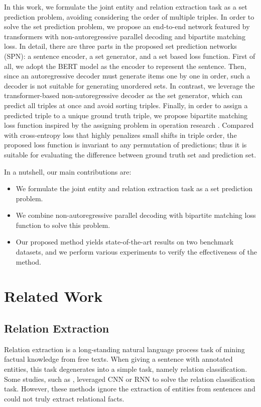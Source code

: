 \documentclass[letterpaper]{article} \usepackage{aaai21}  \usepackage{times}  \usepackage{helvet} \usepackage{courier}  \usepackage[hyphens]{url}  \usepackage{graphicx} \usepackage{amsfonts,amssymb}
\begin{document}
In this work, we formulate the joint entity and relation extraction task as a set prediction problem, avoiding considering the order of multiple triples. In order to solve the set prediction problem, we propose an end-to-end network featured by transformers with non-autoregressive parallel decoding and bipartite matching loss. In detail, there are three parts in the proposed set prediction networks (SPN): a sentence encoder, a set generator, and a set based loss function. First of all, we adopt the BERT model \cite{devlin2018bert} as the encoder to represent the sentence. Then, since an autoregressive decoder must generate items one by one in order, such a decoder is not suitable for generating unordered sets. In contrast, we leverage the transformer-based non-autoregressive decoder \cite{gu2018non} as the set generator, which can predict all triples at once and avoid sorting triples. Finally, in order to assign a predicted triple to a unique ground truth triple, we propose bipartite matching loss function inspired by the assigning problem in operation research \cite{kuhn1955hungarian,munkres1957algorithms,edmonds1972theoretical}. Compared with  cross-entropy loss 
that highly penalizes small shifts in 
triple order, the proposed loss function is invariant to any permutation of predictions; thus it is suitable for evaluating the difference between ground truth set and prediction set.

In a nutshell, our main contributions are:


\begin{itemize}
\item We formulate the joint entity and relation extraction task as a set prediction problem.
\item We combine non-autoregressive parallel decoding with bipartite matching loss function to solve this problem.
\item Our proposed method yields state-of-the-art results on two benchmark datasets, and we perform various experiments to verify the effectiveness of the method.
\textbf{}
\end{itemize}
\section{Related Work}
\subsection{Relation Extraction}
Relation extraction is a long-standing natural language process task of mining factual knowledge from free texts. When giving a sentence with annotated entities, this task degenerates into a simple task, namely relation classification. Some studies, such as \citet{zeng-etal-2014-relation,xu2015classifying}, leveraged CNN or RNN to solve the relation classification task. However, these methods ignore the extraction of entities from sentences and could not truly extract relational facts. 
\end{document}
